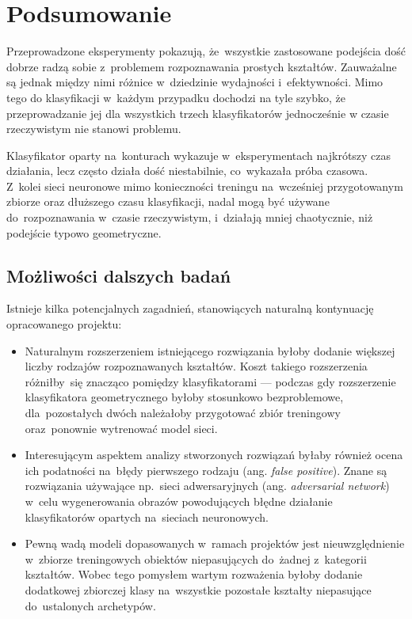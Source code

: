 \documentclass[11pt,a4paper]{article}
\begin{document}
\section{Podsumowanie}

Przeprowadzone eksperymenty pokazują, że~wszystkie zastosowane podejścia dość dobrze radzą sobie z~problemem rozpoznawania prostych kształtów.
Zauważalne są jednak między nimi różnice w~dziedzinie wydajności i~efektywności.
Mimo tego do klasyfikacji w~każdym przypadku dochodzi na tyle szybko, że przeprowadzanie jej dla wszystkich trzech klasyfikatorów jednocześnie w czasie rzeczywistym nie stanowi problemu.

Klasyfikator oparty na~konturach wykazuje w~eksperymentach najkrótszy czas działania, lecz często działa dość niestabilnie, co~wykazała próba czasowa.
Z~kolei sieci neuronowe mimo konieczności treningu na~wcześniej przygotowanym zbiorze oraz dłuższego czasu klasyfikacji, nadal mogą być używane do~rozpoznawania w~czasie rzeczywistym, i~działają mniej chaotycznie, niż podejście typowo geometryczne.

\subsection{Możliwości dalszych badań}

Istnieje kilka potencjalnych zagadnień, stanowiących naturalną kontynuację opracowanego projektu:

\begin{itemize}
    \item Naturalnym rozszerzeniem istniejącego rozwiązania byłoby dodanie większej liczby rodzajów rozpoznawanych kształtów.
    Koszt takiego rozszerzenia różniłby~się znacząco pomiędzy klasyfikatorami --- podczas gdy rozszerzenie klasyfikatora geometrycznego byłoby stosunkowo bezproblemowe, dla~pozostałych dwóch należałoby przygotować zbiór treningowy oraz~ponownie wytrenować model sieci.
    \item Interesującym aspektem analizy stworzonych rozwiązań byłaby również ocena ich podatności na~błędy pierwszego rodzaju (ang. \emph{false positive}).
    Znane są rozwiązania używające np.~sieci adwersaryjnych (ang. \emph{adversarial network}) w~celu wygenerowania obrazów powodujących błędne działanie klasyfikatorów opartych na~sieciach neuronowych.
    \item Pewną wadą modeli dopasowanych w~ramach projektów jest nieuwzględnienie w~zbiorze treningowych obiektów niepasujących do~żadnej z~kategorii kształtów.
    Wobec tego pomysłem wartym rozważenia byłoby dodanie dodatkowej zbiorczej klasy na~wszystkie pozostałe kształty niepasujące do~ustalonych archetypów.
\end{itemize}
\end{document}
